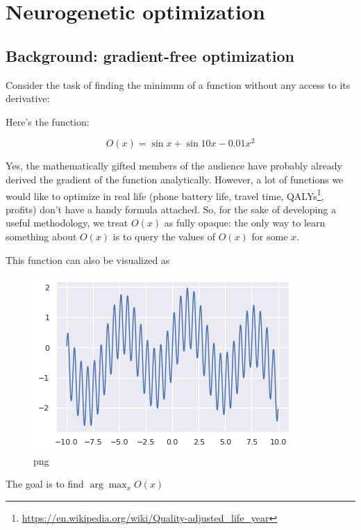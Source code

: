 \section{Neurogenetic optimization}

\subsection{Background: gradient-free optimization}

Consider the task of finding the minimum of a function without any access to its derivative:

Here's the function:

\begin{equation}
O(x) = \sin x + \sin 10x - 0.01x^2
\end{equation}

Yes, the mathematically gifted members of the audience have probably already derived the gradient of the function analytically. However, a lot of functions we would like to optimize in real life (phone battery life, travel time, QALYs\footnote{\url{https://en.wikipedia.org/wiki/Quality-adjusted_life_year}}, profits) don't have a handy formula attached. So, for the sake of developing a useful methodology, we treat $ O(x) $ as fully opaque: the only way to learn something about $ O(x) $ is to query the values of $ O(x) $ for some $x$.

This function can also be visualized as

    
\begin{figure}
    \centering
    \includegraphics[width=0.8\linewidth]{images/neuropt1.png}
    \caption{png}
\end{figure}

    


The goal is to find $ \arg\max_x O(x) $

